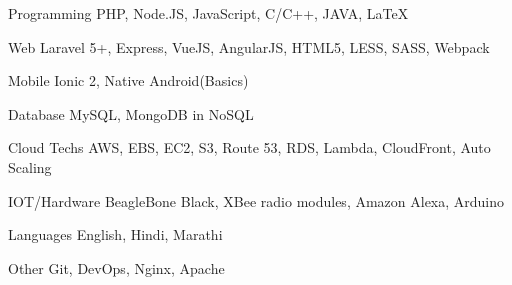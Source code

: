 

\begin{cvskills}

  \cvskill
    {Programming} %
    {PHP, Node.JS, JavaScript, C/C++, JAVA, LaTeX} %

  \cvskill
    {Web} %
    {Laravel 5+, Express, VueJS, AngularJS, HTML5, LESS, SASS, Webpack} %
    
  \cvskill
    {Mobile} %
    {Ionic 2, Native Android(Basics)} %

  \cvskill
    {Database} %
    {MySQL, MongoDB in NoSQL} %

  \cvskill
    {Cloud Techs} %
    {AWS, EBS, EC2, S3, Route 53, RDS, Lambda, CloudFront, Auto Scaling} %

  \cvskill
    {IOT/Hardware} %
    {BeagleBone Black, XBee radio modules, Amazon Alexa, Arduino} %

  \cvskill
    {Languages} %
    {English, Hindi, Marathi} %
    
  \cvskill
    {Other} %
    {Git, DevOps, Nginx, Apache} %
        
    
\end{cvskills}
